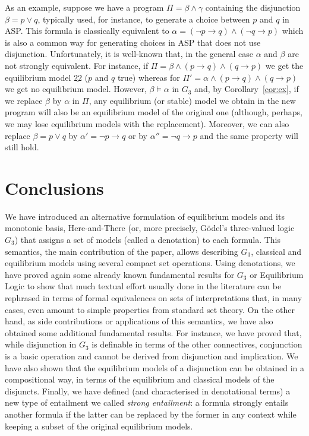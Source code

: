 \documentclass{tlp}
\newcommand{\str}[1]{\underline{#1}}
\begin{document}
As an example, suppose we have a program $\Pi=\beta \wedge \gamma$ containing the disjunction $\beta=p \vee q$, typically used, for instance, to generate a choice between $p$ and $q$ in ASP. This formula is classically equivalent to $\alpha=(\neg p \rightarrow q) \wedge (\neg q \rightarrow p)$ which is also a common way for generating choices in ASP that does not use disjunction. Unfortunately, it is well-known that, in the general case $\alpha$ and $\beta$ are not strongly equivalent. For instance, if $\Pi=\beta \wedge (p\rightarrow q) \wedge (q \rightarrow p)$ we get the equilibrium model $\str{22}$ ($p$ and $q$ true) whereas for $\Pi'=\alpha \wedge (p\rightarrow q) \wedge (q \rightarrow p)$ we get no equilibrium model. However, $\beta \models \alpha$ in $G_3$ and, by Corollary~\ref{cor:ex}, if we replace $\beta$ by $\alpha$ in $\Pi$, any equilibrium (or stable) model we obtain in the new program will also be an equilibrium model of the original one (although, perhaps, we may lose equilibrium models with the replacement). Moreover, we can also replace $\beta=p \vee q$ by $\alpha'=\neg p \rightarrow q$ or by $\alpha''=\neg q \rightarrow p$ and the same property will still hold.

\section{Conclusions}\label{sec:conc}

We have introduced an alternative formulation of equilibrium models and its monotonic basis, Here-and-There (or, more precisely, G\"odel's three-valued logic $G_3$) that assigns a set of models (called a denotation) to each formula. This semantics, the main contribution of the paper, allows describing $G_3$, classical and equilibrium models using several compact set operations. Using denotations, we have proved again some already known fundamental results for $G_3$ or Equilibrium Logic to show that much textual effort usually done in the literature can be rephrased in terms of formal equivalences on sets of interpretations that, in many cases, even amount to simple properties from standard set theory. On the other hand, as side contributions or applications of this semantics, we have also obtained some additional fundamental results. For instance, we have proved that, while disjunction in $G_3$ is definable in terms of the other connectives, conjunction is a basic operation and cannot be derived from disjunction and implication. We have also shown that the equilibrium models of a disjunction can be obtained in a compositional way, in terms of the equilibrium and classical models of the disjuncts. Finally, we have defined (and characterised in denotational terms) a new type of entailment we called \emph{strong entailment}: a formula strongly entails another formula if the latter can be replaced by the former in any context while keeping a subset of the original equilibrium models.
\end{document}
